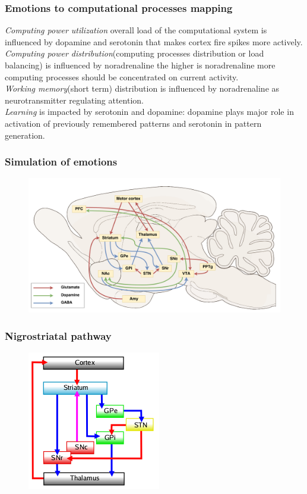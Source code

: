 \documentclass[12pt, aspectratio=169]{beamer}
\begin{document}
\begin{frame}
  \frametitle{Emotions to computational processes mapping}

\emph{Computing power utilization} overall load of the computational system is influenced by dopamine and serotonin that makes cortex fire spikes more actively.\\
\emph{Computing power distribution}(computing processes distribution or load balancing) is influenced by noradrenaline the higher is noradrenaline more computing processes should be concentrated on current activity.\\
\emph{Working memory}(short term) distribution is influenced by noradrenaline as neurotransmitter regulating attention.\\
\emph{Learning} is impacted by serotonin and dopamine: dopamine plays major role in activation of previously remembered patterns and serotonin in pattern generation.\\
\end{frame}


\begin{frame}
\frametitle{Simulation of emotions}
\begin{figure}
\includegraphics[width=0.99\linewidth]{rat_da}
\end{figure}
\end{frame}


\begin{frame}
\frametitle{Nigrostriatal pathway}
\begin{figure}
\includegraphics[width=0.45\linewidth]{nigrostriatal}
\end{figure}
\end{frame}
\end{document}
